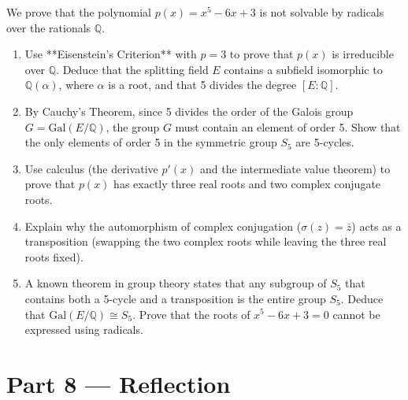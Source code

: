 \documentclass[12pt, a4paper]{article}
\begin{document}
\begin{enumerate}[label=\textbf{D\arabic*.}]
        We prove that the polynomial $p(x) = x^5 - 6x + 3$ is not solvable by radicals over the rationals $\mathbb{Q}$.
        \begin{enumerate}[label=(\alph*)]
          \item Use **Eisenstein's Criterion** with $p=3$ to prove that $p(x)$ is irreducible over $\mathbb{Q}$.
                Deduce that the splitting field $E$ contains a subfield isomorphic to $\mathbb{Q}(\alpha)$, where $\alpha$ is a root, and that 5 divides the degree $[E:\mathbb{Q}]$.
          \item By Cauchy's Theorem, since 5 divides the order of the Galois group $G = \text{Gal}(E/\mathbb{Q})$, the group $G$ must contain an element of order 5.
                Show that the only elements of order 5 in the symmetric group $S_5$ are 5-cycles.
          \item Use calculus (the derivative $p'(x)$ and the intermediate value theorem) to prove that $p(x)$ has exactly three real roots and two complex conjugate roots.
          \item Explain why the automorphism of complex conjugation ($\sigma(z) = \bar{z}$) acts as a transposition (swapping the two complex roots while leaving the three real roots fixed).
          \item A known theorem in group theory states that any subgroup of $S_5$ that contains both a 5-cycle and a transposition is the entire group $S_5$.
                Deduce that $\text{Gal}(E/\mathbb{Q}) \cong S_5$. Prove that the roots of $x^5 - 6x + 3 = 0$ cannot be expressed using radicals.
        \end{enumerate}
\end{enumerate}

\newpage

\section{Part 8 --- Reflection}
\end{document}
